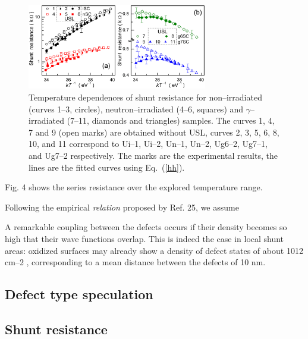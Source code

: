 \documentclass[aip,jap, amsmath,amssymb,reprint]{revtex4-1}
\begin{document}
\begin{figure}
\includegraphics[width=0.7\textwidth]{olikhFig8}%
\caption{\label{fig_Rsh}
Temperature dependences of shunt resistance for non--irradiated (curves 1--3, circles),
neutron--irradiated (4--6, squares) and $\gamma$--irradiated (7--11, diamonds and triangles) samples.
The curves 1, 4, 7 and 9 (open marks) are obtained without USL,
curves 2, 3, 5, 6, 8, 10, and 11 correspond to
Ui--1, Ui--2, Un--1, Un--2, Ug6--2, Ug7--1, and Ug7--2 respectively.
The marks are the experimental results, the lines are the fitted curves using Eq.~(\ref{hh}).
}%
\end{figure}

Fig. 4 shows the  series resistance  over the explored temperature range.
\cite{Oxide_Schon,Oxide:Porrini,LIDRev2}


Following the empirical \emph{relation} proposed by Ref. 25, we assume


A remarkable coupling between the
defects occurs if their density becomes so high that their
wave functions overlap. This is indeed the case in local shunt
areas: oxidized surfaces may already show a density of
defect states of about 1012
cm–2
, corresponding to a mean
distance between the defects of 10 nm.






\subsection{Defect type speculation\label{DefectType}}

\subsection{Shunt resistance\label{Rsh}}
\end{document}
